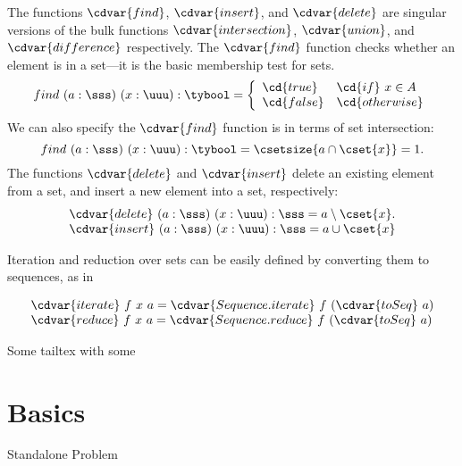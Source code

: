 \begin{gram}
The functions $\cdvar{find}$, $\cdvar{insert}$, and $\cdvar{delete}$ are singular
versions of the bulk functions $\cdvar{intersection}$, $\cdvar{union}$, and
$\cdvar{difference}$ respectively.
%
The $\cdvar{find}$ function checks whether an element is in a set---it is
the basic membership test for sets.
%
\[
find~(a  : \sss)~(x : \uuu) : \tybool = \left\{
                \begin{array}{ll}
                \cd{true} & \cd{if}~x \in A \\
                \cd{false} & \cd{otherwise}
                \end{array} \right.
\]
%
We can also specify the $\cdvar{find}$ function is in terms of set
intersection:
\[
find~(a : \sss)~(x : \uuu) : \tybool = \csetsize{a \cap \cset{x}} = 1.
\]
%
The functions $\cdvar{delete}$ and $\cdvar{insert}$ 
%
delete an existing element from a set, and
%
insert a new element into a set,
%
respectively:
%
\[
\begin{array}{l}
\cdvar{delete}~(a  : \sss)~(x  : \uuu) : \sss = a \setminus \cset{x}.\\
\cdvar{insert}~(a : \sss)~(x : \uuu) : \sss = a \cup \cset{x}
\end{array}
\]
%
\end{gram}

\begin{gram}
Iteration and reduction over sets can be easily defined by converting
them to sequences, as in

\[
\begin{array}{l}
\cdvar{iterate}~f~x~a = \cdvar{Sequence.iterate}~f~(\cdvar{toSeq}~a)\\
\cdvar{reduce}~f~x~a = \cdvar{Sequence.reduce}~f~(\cdvar{toSeq}~a)
\end{array}
\]
\end{gram}

Some tailtex with some \command


\section[50]{Basics}

\begin{problem}
Standalone Problem
\end{problem}

